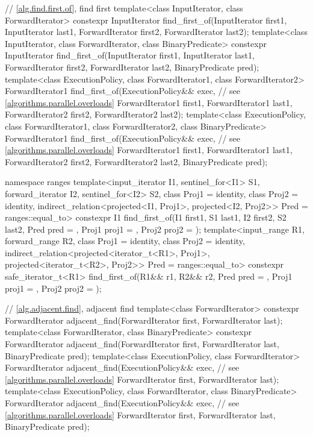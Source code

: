 \begin{codeblock}
{  // \ref{alg.find.first.of}, find first
  template<class InputIterator, class ForwardIterator>
    constexpr InputIterator
      find_first_of(InputIterator first1, InputIterator last1,
                    ForwardIterator first2, ForwardIterator last2);
  template<class InputIterator, class ForwardIterator, class BinaryPredicate>
    constexpr InputIterator
      find_first_of(InputIterator first1, InputIterator last1,
                    ForwardIterator first2, ForwardIterator last2,
                    BinaryPredicate pred);
  template<class ExecutionPolicy, class ForwardIterator1, class ForwardIterator2>
    ForwardIterator1
      find_first_of(ExecutionPolicy&& exec,                     // see \ref{algorithms.parallel.overloads}
                    ForwardIterator1 first1, ForwardIterator1 last1,
                    ForwardIterator2 first2, ForwardIterator2 last2);
  template<class ExecutionPolicy, class ForwardIterator1,
           class ForwardIterator2, class BinaryPredicate>
    ForwardIterator1
      find_first_of(ExecutionPolicy&& exec,                     // see \ref{algorithms.parallel.overloads}
                    ForwardIterator1 first1, ForwardIterator1 last1,
                    ForwardIterator2 first2, ForwardIterator2 last2,
                    BinaryPredicate pred);

  namespace ranges {
    template<input_iterator I1, sentinel_for<I1> S1, forward_iterator I2, sentinel_for<I2> S2,
             class Proj1 = identity, class Proj2 = identity,
             indirect_relation<projected<I1, Proj1>,
                               projected<I2, Proj2>> Pred = ranges::equal_to>
      constexpr I1 find_first_of(I1 first1, S1 last1, I2 first2, S2 last2,
                                 Pred pred = {},
                                 Proj1 proj1 = {}, Proj2 proj2 = {});
    template<input_range R1, forward_range R2, class Proj1 = identity, class Proj2 = identity,
             indirect_relation<projected<iterator_t<R1>, Proj1>,
                               projected<iterator_t<R2>, Proj2>> Pred = ranges::equal_to>
      constexpr safe_iterator_t<R1>
        find_first_of(R1&& r1, R2&& r2,
                      Pred pred = {},
                      Proj1 proj1 = {}, Proj2 proj2 = {});
  }

  // \ref{alg.adjacent.find}, adjacent find
  template<class ForwardIterator>
    constexpr ForwardIterator
      adjacent_find(ForwardIterator first, ForwardIterator last);
  template<class ForwardIterator, class BinaryPredicate>
    constexpr ForwardIterator
      adjacent_find(ForwardIterator first, ForwardIterator last,
                    BinaryPredicate pred);
  template<class ExecutionPolicy, class ForwardIterator>
    ForwardIterator
      adjacent_find(ExecutionPolicy&& exec,                     // see \ref{algorithms.parallel.overloads}
                    ForwardIterator first, ForwardIterator last);
  template<class ExecutionPolicy, class ForwardIterator, class BinaryPredicate>
    ForwardIterator
      adjacent_find(ExecutionPolicy&& exec,                     // see \ref{algorithms.parallel.overloads}
                    ForwardIterator first, ForwardIterator last,
                    BinaryPredicate pred);

}
\end{codeblock}

